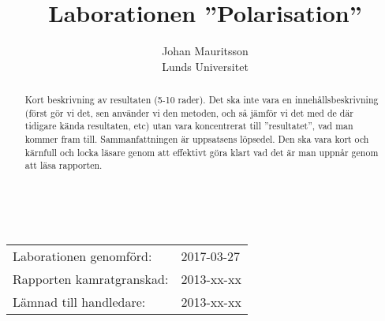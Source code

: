 \documentclass[a4paper]{article}
\title{Laborationen ”Polarisation”}
\author{Johan Mauritsson\\Lunds Universitet}
\makeatletter
\renewcommand*\maketitle{
  {
    \begin{center}
      {\huge\bfseries \@title}\\
      \vspace{5mm}
      {\large \@author}
    \end{center}
    \vspace{2mm}
  }
}
\makeatother
\begin{document}
\maketitle


\begin{abstract}
  Kort beskrivning  av resultaten (5-10  rader). Det ska inte  vara en
  innehållsbeskrivning (först gör vi det, sen använder vi den metoden,
  och så jämför vi det med de där tidigare kända resultaten, etc) utan
  vara   koncentrerat  till   ”resultatet”,   vad   man  kommer   fram
  till. Sammanfattningen är uppsatsens löpsedel. Den ska vara kort och
  kärnfull och locka läsare genom att  effektivt göra klart vad det är
  man uppnår genom att läsa rapporten.
\end{abstract}

\vspace{2mm}

\hspace{-3mm}
\begin{tabular}{ll}
Laborationen genomförd: &	2017-03-27 \\
Rapporten kamratgranskad: &	2013-xx-xx \\
Lämnad till handledare: &	2013-xx-xx \\
\end{tabular}

\vspace{3mm}
\end{document}
